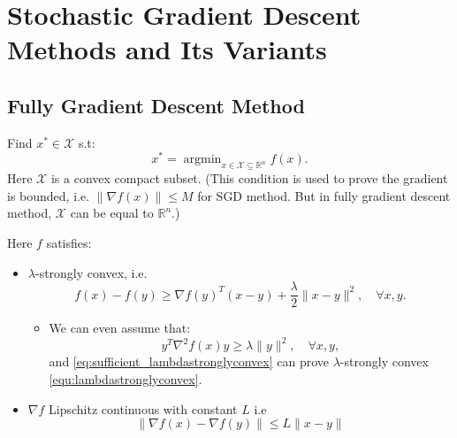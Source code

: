 
\chapter{Stochastic Gradient Descent Methods and Its Variants}

\section{Fully Gradient Descent Method}
\begin{problem}Find ${x}^{*} \in \mathcal{X}$  s.t:
\begin{equation}\label{equ:sum-opt}
{x}^* = \mathop{\arg\min}_{{x} \in \mathcal{X} \subseteq \mathbb{R}^{n}} f(x).
\end{equation}
Here $\mathcal{X}$ is a convex compact subset. (This condition is used to prove the gradient is bounded, i.e. $\|\nabla f(x)\| \le M$ for SGD method. But in fully gradient descent method, $\mathcal{X}$ can be equal to $\mathbb{R}^n$.)
\end{problem}

\begin{assumption}\label{assum:GDconvergence}
Here $f$ satisfies:
\begin{itemize}
\item $\lambda$-strongly convex, i.e.
\begin{equation}\label{equ:lambdastronglyconvex}
f(x) - f(y) \ge \nabla f(y)^T(x-y) + \frac{\lambda}{2}\|x-y\|^2, \quad \forall x, y.
\end{equation}
\begin{itemize}
\item We can even assume that: 
\begin{equation}\label{eq:sufficient_lambdastronglyconvex}
y^T\nabla^2 f(x)y \ge \lambda \|y\|^2, \quad \forall x, y,
\end{equation}
and \eqref{eq:sufficient_lambdastronglyconvex} can prove $\lambda$-strongly convex \eqref{equ:lambdastronglyconvex}.
\end{itemize}
\item $\nabla f$ Lipschitz continuous with constant $L$ i.e
\begin{equation}\label{eq:lipschtizcont}
\| \nabla f(x) - \nabla f(y)\| \le L \|x- y\|
\end{equation}
\end{itemize}
\end{assumption}

